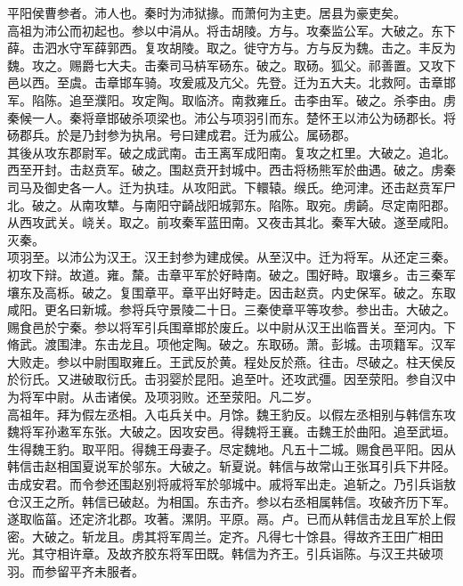 \documentclass{zhvt-classic}
\begin{document}

\hspace*{2em}平阳侯曹参者。沛人也。秦时为沛狱掾。而萧何为主吏。居县为豪吏矣。\\
\hspace*{2em}高祖为沛公而初起也。参以中涓从。将击胡陵。方与。攻秦监公军。大破之。东下薛。击泗水守军薛郭西。复攻胡陵。取之。徙守方与。方与反为魏。击之。丰反为魏。攻之。赐爵七大夫。击秦司马枿军砀东。破之。取砀。狐父。祁善置。又攻下邑以西。至虞。击章邯车骑。攻爰戚及亢父。先登。迁为五大夫。北救阿。击章邯军。陷陈。追至濮阳。攻定陶。取临济。南救雍丘。击李由军。破之。杀李由。虏秦候一人。秦将章邯破杀项梁也。沛公与项羽引而东。楚怀王以沛公为砀郡长。将砀郡兵。於是乃封参为执帛。号曰建成君。迁为戚公。属砀郡。\\
\hspace*{2em}其後从攻东郡尉军。破之成武南。击王离军成阳南。复攻之杠里。大破之。追北。西至开封。击赵贲军。破之。围赵贲开封城中。西击将杨熊军於曲遇。破之。虏秦司马及御史各一人。迁为执珪。从攻阳武。下轘辕。缑氏。绝河津。还击赵贲军尸北。破之。从南攻犨。与南阳守齮战阳城郭东。陷陈。取宛。虏齮。尽定南阳郡。从西攻武关。峣关。取之。前攻秦军蓝田南。又夜击其北。秦军大破。遂至咸阳。灭秦。\\
\hspace*{2em}项羽至。以沛公为汉王。汉王封参为建成侯。从至汉中。迁为将军。从还定三秦。初攻下辩。故道。雍。斄。击章平军於好畤南。破之。围好畤。取壤乡。击三秦军壤东及高栎。破之。复围章平。章平出好畤走。因击赵贲。内史保军。破之。东取咸阳。更名曰新城。参将兵守景陵二十日。三秦使章平等攻参。参出击。大破之。赐食邑於宁秦。参以将军引兵围章邯於废丘。以中尉从汉王出临晋关。至河内。下脩武。渡围津。东击龙且。项他定陶。破之。东取砀。萧。彭城。击项籍军。汉军大败走。参以中尉围取雍丘。王武反於黄。程处反於燕。往击。尽破之。柱天侯反於衍氏。又进破取衍氏。击羽婴於昆阳。追至叶。还攻武彊。因至荥阳。参自汉中为将军中尉。从击诸侯。及项羽败。还至荥阳。凡二岁。\\
\hspace*{2em}高祖年。拜为假左丞相。入屯兵关中。月馀。魏王豹反。以假左丞相别与韩信东攻魏将军孙遫军东张。大破之。因攻安邑。得魏将王襄。击魏王於曲阳。追至武垣。生得魏王豹。取平阳。得魏王母妻子。尽定魏地。凡五十二城。赐食邑平阳。因从韩信击赵相国夏说军於邬东。大破之。斩夏说。韩信与故常山王张耳引兵下井陉。击成安君。而令参还围赵别将戚将军於邬城中。戚将军出走。追斩之。乃引兵诣敖仓汉王之所。韩信已破赵。为相国。东击齐。参以右丞相属韩信。攻破齐历下军。遂取临菑。还定济北郡。攻著。漯阴。平原。鬲。卢。已而从韩信击龙且军於上假密。大破之。斩龙且。虏其将军周兰。定齐。凡得七十馀县。得故齐王田广相田光。其守相许章。及故齐胶东将军田既。韩信为齐王。引兵诣陈。与汉王共破项羽。而参留平齐未服者。\\
\end{document}
